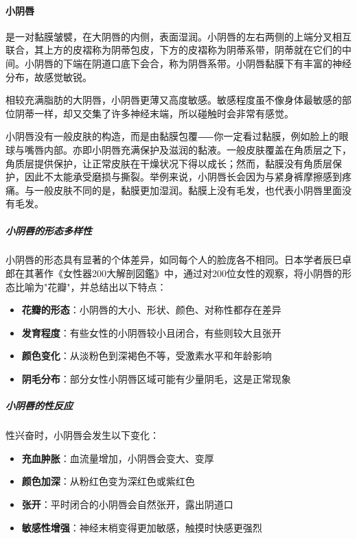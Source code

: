 \begin{enumerate}
\paragraph{小阴唇}
是一对黏膜皱襞，在大阴唇的内侧，表面湿润。小阴唇的左右两侧的上端分叉相互联合，其上方的皮褶称为阴蒂包皮，下方的皮褶称为阴蒂系带，阴蒂就在它们的中间。小阴唇的下端在阴道口底下会合，称为阴唇系带。小阴唇黏膜下有丰富的神经分布，故感觉敏锐。

相较充满脂肪的大阴唇，小阴唇更薄又高度敏感。敏感程度虽不像身体最敏感的部位阴蒂一样，却又交集了许多神经末端，所以碰触时会非常有感觉。

小阴唇没有一般皮肤的构造，而是由黏膜包覆⸺你一定看过黏膜，例如脸上的眼球与嘴唇内部。亦即小阴唇充满保护及滋润的黏液。一般皮肤覆盖在角质层之下，角质层提供保护，让正常皮肤在干燥状况下得以成长；然而，黏膜没有角质层保护，因此不太能承受磨损与撕裂。举例来说，小阴唇长会因为与紧身裤摩擦感到疼痛。与一般皮肤不同的是，黏膜更加湿润。黏膜上没有毛发，也代表小阴唇里面没有毛发。

\subparagraph{小阴唇的形态多样性}

小阴唇的形态具有显著的个体差异，如同每个人的脸庞各不相同。日本学者辰巳卓郎在其著作《女性器200大解剖図鑑》中，通过对200位女性的观察，将小阴唇的形态比喻为"花瓣"，并总结出以下特点：

\begin{itemize}
    \item \textbf{花瓣的形态}：小阴唇的大小、形状、颜色、对称性都存在差异
    \item \textbf{发育程度}：有些女性的小阴唇较小且闭合，有些则较大且张开
    \item \textbf{颜色变化}：从淡粉色到深褐色不等，受激素水平和年龄影响
    \item \textbf{阴毛分布}：部分女性小阴唇区域可能有少量阴毛，这是正常现象
\end{itemize}

\subparagraph{小阴唇的性反应}

性兴奋时，小阴唇会发生以下变化：
\begin{itemize}
    \item \textbf{充血肿胀}：血流量增加，小阴唇会变大、变厚
    \item \textbf{颜色加深}：从粉红色变为深红色或紫红色
    \item \textbf{张开}：平时闭合的小阴唇会自然张开，露出阴道口
    \item \textbf{敏感性增强}：神经末梢变得更加敏感，触摸时快感更强烈
\end{itemize}


\end{enumerate}
